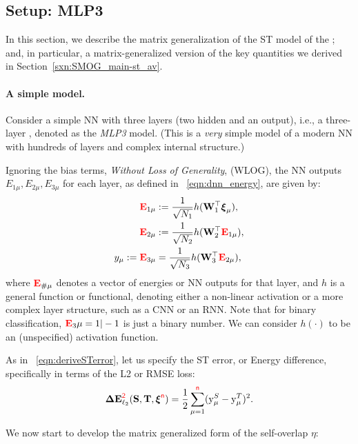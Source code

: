 \subsection{\MultiLayer Setup: MLP3}
\label{sxn:matgen_mlp3}

In this section, we describe the matrix generalization of the ST  model of the \LinearPerceptron; and, 
in particular, a matrix-generalized version of the key quantities we derived in Section~\ref{sxn:SMOG_main-st_av}.

\paragraph{A simple model.}

Consider a simple NN with three layers (two hidden and an output), i.e., a three-layer \MultiLayerPerceptron, denoted as the \emph{MLP3} model.
(This is a \emph{very} simple model of a modern NN with hundreds of layers and complex internal structure.)

Ignoring the bias terms, \emph{Without Loss of Generality}, (WLOG), the NN outputs
 $E_{1\mu},E_{2\mu},E_{3\mu}$ for each layer, as defined in \EQN~\ref{eqn:dnn_energy}, are given by:
\begin{align}
\nonumber
  {{\color{red}\sf{\mathbf{E}}}}_{1\mu} &:= \frac{1}{\sqrt{N_1}} h ({\mathbf{W}}_1^\top \boldsymbol{\xi}_{\mu}) , \\
\nonumber
  {{\color{red}\sf{\mathbf{E}}}}_{2\mu} &:= \frac{1}{\sqrt{N_2}} h ({\mathbf{W}}_2^\top {{\color{red}\sf{\mathbf{E}}}}_{1\mu})     , \\
\label{eqn:nflow}
             y_{\mu} := {{\color{red}\sf{\mathbf{E}}}}_{3\mu} &= \frac{1}{\sqrt{N_3}} h ({\mathbf{W}}_{3}^\top {{\color{red}\sf{\mathbf{E}}}}_{2\mu})     ,
\end{align}
where ${{\color{red}\sf{\mathbf{E}}}}_{\#\mu}$ denotes a vector of energies or NN outputs for that layer, and $h$ is a general function or functional, denoting either a non-linear activation or a more complex layer structure, such as a CNN or an RNN.  Note that for binary classification, ${{\color{red}\sf{\mathbf{E}}}}_3{\mu}=1|-1$ is just a binary number.  
We can consider $h(\cdot)$ to be an (unspecified) activation function.

As in \EQN~\ref{eqn:deriveSTerror}, let us specify the ST error, or Energy difference, specifically in terms of the L2 or RMSE loss:
\begin{equation}
\label{eqn:DE}
\mathbf{\Delta {E}}^{{\color{red}\sf{2}}}_{\ell_2}({\mathbf{S}},{\mathbf{T}}, \boldsymbol{\xi}^{{\color{red}\sf{n}}}) = \frac{1}{2}\sum_{\mu=1}^{{\color{red}\sf{n}}} (\mathrm{y}_{\mu}^{S} - \mathrm{y}_{\mu}^{T})^2.
\end{equation}

We now start to develop the  matrix generalized form of the self-overlap \(\eta\):


